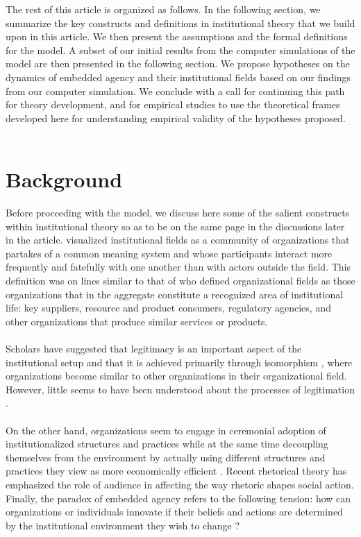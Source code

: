 \documentclass[12pt]{article}
\begin{document}
\noindent The rest of this article is organized as follows. In the following section, we summarize the key constructs and definitions in institutional theory that we build upon in this article. We then present the assumptions and the formal definitions for the model. A subset of our initial results from the computer simulations of the model are then presented in the following section. We propose hypotheses on the dynamics of embedded agency and their institutional fields based on our findings from our computer simulation. We conclude with a call for continuing this path for theory development, and for empirical studies to use the theoretical frames developed here for understanding empirical validity of the hypotheses proposed.\\\\

\section{Background}
Before proceeding with the model, we discuss here some of the salient constructs within institutional theory so as to be on the same page in the discussions later in the article. \cite{Scott1995} visualized institutional fields as a community of organizations that partakes of a common meaning system and whose participants interact more frequently and fatefully with one another than with actors outside the field. This definition was on lines similar to that of \cite{Dimaggio1983} who defined organizational fields as those organizations that in the aggregate constitute a recognized area of institutional life: key suppliers, resource and product consumers, regulatory agencies, and other organizations that produce similar services or products. \\\\
Scholars have suggested that legitimacy is an important aspect of the institutional setup and that it  is achieved primarily through isomorphism \citep{Kostova2008}, where organizations become similar to other organizations in their organizational field. However, little seems to have been understood about the processes of legitimation \citep{Harmon2015}. \\\\
On the other hand, organizations seem to engage in ceremonial adoption of institutionalized structures and practices while at the same time decoupling themselves from the environment by actually using different structures and practices they view as more economically efficient \citep{Kostova2008}. Recent rhetorical theory has emphasized the role of audience in affecting the way rhetoric shapes social action. Finally, the paradox of embedded agency refers  to the following tension: how can organizations or individuals innovate if their beliefs and actions are determined by the institutional environment they wish to change \citep{Scott1987}? \\\\
\end{document}
